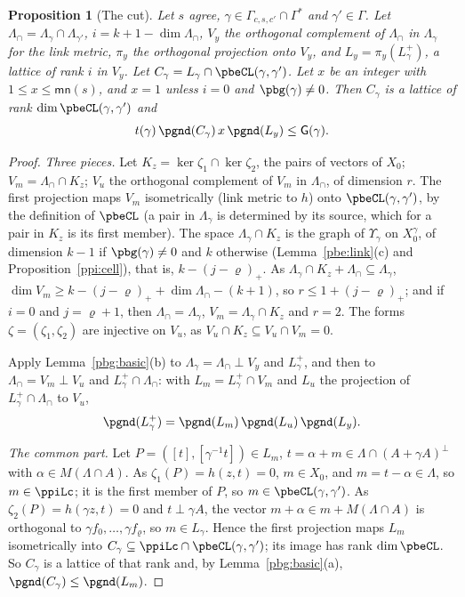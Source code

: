 \documentclass[10pt]{amsart}
\newtheorem{proposition}[theorem]{Proposition}
\theoremstyle{definition}
\theoremstyle{remark}
\begin{document}
\begin{proposition}[The cut]\label{pbg:cut}
Let $s$ agree, $\gamma\in\Gamma_{c,s,c'}\cap\Gamma^*$ and $\gamma'\in\Gamma$. Let $\Lambda_\cap=
\Lambda_\gamma\cap\Lambda_{\gamma'}$, $i=k+1-\dim\Lambda_\cap$, $V_y$ the orthogonal complement of
$\Lambda_\cap$ in $\Lambda_\gamma$ for the link metric, $\pi_y$ the orthogonal projection onto $V_y$, and
$L_y=\pi_y(L^+_\gamma)$, a lattice of rank $i$ in $V_y$. Let $C_\gamma=L_\gamma\cap\pbeCL(\gamma,\gamma')$.
Let $x$ be an integer with $1\le x\le\mathsf{mn}(s)$, and $x=1$ unless $i=0$ and $\pbg(\gamma)\ne0$. Then $C_\gamma$ is a lattice of rank $\dim\pbeCL(\gamma,\gamma')$
and
\[
t(\gamma)\,\pgnd(C_\gamma)\,x\,\pgnd(L_y)\le\mathsf G(\gamma).
\]
\end{proposition}
\begin{proof}
\emph{Three pieces.} Let $K_z=\ker\zeta_1\cap\ker\zeta_2$, the pairs of vectors of $X_0$; $V_m=
\Lambda_\cap\cap K_z$; $V_u$ the orthogonal complement of $V_m$ in $\Lambda_\cap$, of dimension $r$. The
first projection maps $V_m$ isometrically (link metric to $h$) onto $\pbeCL(\gamma,\gamma')$, by the
definition of $\pbeCL$ (a pair in $\Lambda_\gamma$ is determined by its source, which for a pair in
$K_z$ is its first member). The space $\Lambda_\gamma\cap K_z$ is the graph of $\Upsilon_\gamma$ on
$X_0^\gamma$, of dimension $k-1$ if $\pbg(\gamma)\ne0$ and $k$ otherwise (Lemma~\ref{pbe:link}(c) and
Proposition~\ref{ppi:cell}), that is, $k-(j-\varrho)_+$. As $\Lambda_\gamma\cap K_z+\Lambda_\cap\subseteq
\Lambda_\gamma$, $\dim V_m\ge k-(j-\varrho)_++\dim\Lambda_\cap-(k+1)$, so $r\le1+(j-\varrho)_+$; and if
$i=0$ and $j=\varrho+1$, then $\Lambda_\cap=\Lambda_\gamma$, $V_m=\Lambda_\gamma\cap K_z$ and $r=2$. The
forms $\zeta=(\zeta_1,\zeta_2)$ are injective on $V_u$, as $V_u\cap K_z\subseteq V_u\cap V_m=0$.

Apply Lemma~\ref{pbg:basic}(b) to $\Lambda_\gamma=\Lambda_\cap\perp V_y$ and $L^+_\gamma$, and then to
$\Lambda_\cap=V_m\perp V_u$ and $L^+_\gamma\cap\Lambda_\cap$: with $L_m=L^+_\gamma\cap V_m$ and $L_u$ the
projection of $L^+_\gamma\cap\Lambda_\cap$ to $V_u$,
\[
\pgnd(L^+_\gamma)=\pgnd(L_m)\,\pgnd(L_u)\,\pgnd(L_y).
\]

\emph{The common part.} Let $P=([t],[\gamma^{-1}t])\in L_m$, $t=\alpha+m\in\Lambda\cap(A+\gamma A)^\perp$
with $\alpha\in M(\Lambda\cap A)$. As $\zeta_1(P)=h(z,t)=0$, $m\in X_0$, and $m=t-\alpha\in\Lambda$, so
$m\in\ppiLc$; it is the first member of $P$, so $m\in\pbeCL(\gamma,\gamma')$. As $\zeta_2(P)=h(\gamma
z,t)=0$ and $t\perp\gamma A$, the vector $m+\alpha\in m+M(\Lambda\cap A)$ is orthogonal to $\gamma f_0,
\dots,\gamma f_\varrho$, so $m\in L_\gamma$. Hence the first projection maps $L_m$ isometrically into
$C_\gamma\subseteq\ppiLc\cap\pbeCL(\gamma,\gamma')$; its image has rank $\dim\pbeCL$. So $C_\gamma$ is a
lattice of that rank and, by Lemma~\ref{pbg:basic}(a), $\pgnd(C_\gamma)\le\pgnd(L_m)$.


\end{proof}
\end{document}
